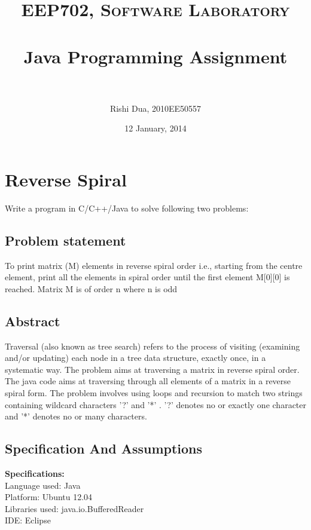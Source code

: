 \documentclass[paper=a4, fontsize=11pt]{scrartcl} %
\title{	
\normalfont \normalsize 
\textsc{EEP702, Software Laboratory} \\ [25pt] %
\horrule{0.5pt} \\[0.4cm] %
\huge Java Programming Assignment \\ %
\horrule{2pt} \\[0.5cm] %
}
\author{Rishi Dua, 2010EE50557} %
\date{\normalsize 12 January, 2014} %
\numberwithin{equation}{section} %
\numberwithin{figure}{section} %
\numberwithin{table}{section} %
\begin{document}
\maketitle %


\section{Reverse Spiral}
Write a program in C/C++/Java to solve following two problems:

\subsection{Problem statement}
To print matrix (M) elements in reverse spiral order i.e., starting from the centre element, print all the elements in spiral order until the first element M[0][0] is reached. Matrix M is of order n where n is odd

\subsection{Abstract}

Traversal (also known as tree search) refers to the process of visiting (examining and/or updating) each node in a tree data structure, exactly once, in a systematic way. The problem aims at traversing a matrix in reverse spiral order.\\

The java code aims at traversing through all elements of a matrix in a reverse spiral form. The problem involves using loops and recursion to match two strings containing wildcard characters '?' and '*' . '?' denotes no or exactly one character and '*' denotes no or many characters.

\subsection{Specification And Assumptions}
{\textbf {Specifications:}}\\
Language used: Java\\
Platform: Ubuntu 12.04\\
Libraries used: java.io.BufferedReader\\
IDE: Eclipse\\
\end{document}
